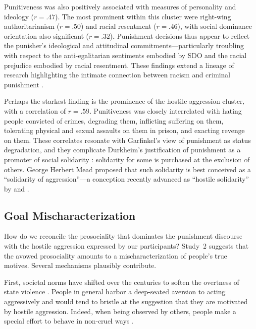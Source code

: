 Punitiveness was also positively associated with measures of personality and ideology ($r = .47$). The most prominent within this cluster were right-wing authoritarianism ($r = .50$) and racial resentment ($r = .46$), with social dominance orientation also significant ($r = .32$). Punishment decisions thus appear to reflect the punisher's ideological and attitudinal commitments---particularly troubling with respect to the anti-egalitarian sentiments embodied by SDO and the racial prejudice embodied by racial resentment. These findings extend a lineage of research highlighting the intimate connection between racism and criminal punishment \citep{Armour2020, BoboJohnson2004, ChiricosWelchGertz2004, UnneverCullen2010a}.

Perhaps the starkest finding is the prominence of the hostile aggression cluster, with a correlation of $r = .59$. Punitiveness was closely interrelated with hating people convicted of crimes, degrading them, inflicting suffering on them, tolerating physical and sexual assaults on them in prison, and exacting revenge on them. These correlates resonate with Garfinkel's \citeyearpar{Garfinkel1956} view of punishment as status degradation, and they complicate Durkheim's justification of punishment as a promoter of social solidarity \citep[see][]{Garland1990}: solidarity for some is purchased at the exclusion of others. George Herbert Mead \citeyearpar{Mead1918} proposed that such solidarity is best conceived as a ``solidarity of aggression''---a conception recently advanced as ``hostile solidarity'' by \citet{Carvalho2018} and \citet{ChamberlenCarvalho2019}.

\subsection{Goal Mischaracterization}

How do we reconcile the prosociality that dominates the punishment discourse with the hostile aggression expressed by our participants? Study~2 suggests that the avowed prosociality amounts to a mischaracterization of people's true motives. Several mechanisms plausibly contribute.

First, societal norms have shifted over the centuries to soften the overtness of state violence \citep{Elias1969, Foucault1977, Garland1991}. People in general harbor a deep-seated aversion to acting aggressively \citep{CrockettEtAl2014, CushmanEtAl2012} and would tend to bristle at the suggestion that they are motivated by hostile aggression. Indeed, when being observed by others, people make a special effort to behave in non-cruel ways \citep{FincherTetlock2015, GantmanEtAl2017}.


